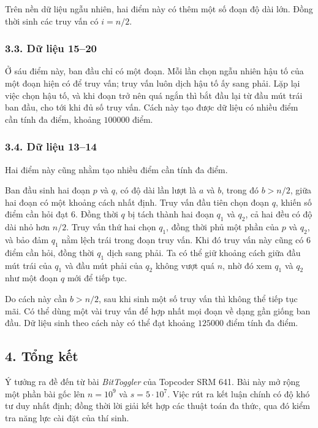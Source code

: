 \documentclass[11pt]{article}
\begin{document}
Trên nền dữ liệu ngẫu nhiên, hai điểm này có thêm một số đoạn độ dài lớn. Đồng
thời sinh các truy vấn có \(i=n/2\).

\subsubsection*{3.3. Dữ liệu 15--20}

Ở sáu điểm này, ban đầu chỉ có một đoạn. Mỗi lần chọn ngẫu nhiên hậu tố của
một đoạn hiện có để truy vấn; truy vấn luôn dịch hậu tố ấy sang phải. Lặp lại
việc chọn hậu tố, và khi đoạn trở nên quá ngắn thì bắt đầu lại từ đầu mút trái
ban đầu, cho tới khi đủ số truy vấn. Cách này tạo được dữ liệu có nhiều điểm
cần tính đa điểm, khoảng \(100000\) điểm.

\subsubsection*{3.4. Dữ liệu 13--14}

Hai điểm này cũng nhằm tạo nhiều điểm cần tính đa điểm.

Ban đầu sinh hai đoạn \(p\) và \(q\), có độ dài lần lượt là \(a\) và \(b\),
trong đó \(b>n/2\), giữa hai đoạn có một khoảng cách nhất định. Truy vấn đầu
tiên chọn đoạn \(q\), khiến số điểm cần hỏi đạt \(6\). Đồng thời \(q\) bị tách
thành hai đoạn \(q_1\) và \(q_2\), cả hai đều có độ dài nhỏ hơn \(n/2\).
Truy vấn thứ hai chọn \(q_1\), đồng thời phủ một phần của \(p\) và \(q_2\), và
bảo đảm \(q_1\) nằm lệch trái trong đoạn truy vấn. Khi đó truy vấn này cũng có
\(6\) điểm cần hỏi, đồng thời \(q_1\) dịch sang phải. Ta có thể giữ khoảng
cách giữa đầu mút trái của \(q_1\) và đầu mút phải của \(q_2\) không vượt quá
\(n\), nhờ đó xem \(q_1\) và \(q_2\) như một đoạn \(q\) mới để tiếp tục.

Do cách này cần \(b>n/2\), sau khi sinh một số truy vấn thì không thể tiếp tục
mãi. Có thể dùng một vài truy vấn để hợp nhất mọi đoạn về dạng gần giống ban
đầu. Dữ liệu sinh theo cách này có thể đạt khoảng \(125000\) điểm tính đa
điểm.

\subsection*{4. Tổng kết}

Ý tưởng ra đề đến từ bài \emph{BitToggler} của Topcoder SRM 641. Bài này mở
rộng một phần bài gốc lên \(n=10^9\) và \(s=5\cdot10^7\). Việc rút ra kết
luận chính có độ khó tư duy nhất định; đồng thời lời giải kết hợp các thuật
toán đa thức, qua đó kiểm tra năng lực cài đặt của thí sinh.
\end{document}
